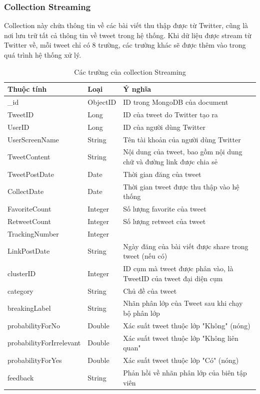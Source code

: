 		\subsubsection{Collection Streaming}
		Collection này chứa thông tin về các bài viết thu thập được từ Twitter, cũng là nơi lưu trữ tất cả thông tin về tweet trong hệ thống. Khi dữ liệu được stream từ Twitter về, mỗi tweet chỉ có 8 trường, các trường khác sẽ được thêm vào trong quá trình hệ thống xử lý.
		\begin{table}[H]
			\setlength\extrarowheight{3pt}
			\begin{tabular}{|l|l|p{7.25cm}|}
				\hline
				\textbf{Thuộc tính}     & \textbf{Loại} & \textbf{Ý nghĩa} \\\hline
				\_id           & ObjectID       & ID trong MongoDB của document \\\hline
				TweetID        & Long           & ID của tweet do Twitter tạo ra\\\hline
				UserID         & Long           & ID của người dùng Twitter\\\hline
				UserScreenName & String         & Tên tài khoản của người dùng Twitter \\\hline
				TweetContent   & String         & Nội dung của tweet, bao gồm nội dung chữ và đường link được chia sẻ\\\hline
				TweetPostDate  & Date           & Thời gian đăng của tweet\\\hline
				CollectDate    & Date           & Thời gian tweet được thu thập vào hệ thống\\\hline
				FavoriteCount  & Integer        & Số lượng favorite của tweet\\\hline
				RetweetCount   & Integer        & Số lượng retweet của tweet\\\hline
				TrackingNumber & Integer        & \\\hline
				LinkPostDate   & String         & Ngày đăng của bài viết được share trong tweet (nếu có)\\\hline
				clusterID      & Integer        &  ID cụm mà tweet được phân vào, là TweetID của tweet đại diện cụm\\\hline
				category       & String         & Chủ đề của tweet\\\hline
				breakingLabel  & String         & Nhãn phân lớp của Tweet sau khi chạy bộ phân lớp\\\hline
				probabilityForNo & Double       & Xác suất tweet thuộc lớp "Không" (nóng)\\\hline
				probabilityForIrrelevant & Double         &  Xác suất tweet thuộc lớp "Không liên quan"\\\hline
				probabilityForYes & Double         &  Xác suất tweet thuộc lớp "Có" (nóng)\\\hline
				feedback      & String        & Phản hồi về nhãn phân lớp của biên tập viên\\\hline
				
			\end{tabular}%
			
			\caption{Các trường của collection Streaming}
			\label{tab:table_3_2}%
		\end{table}%
		
